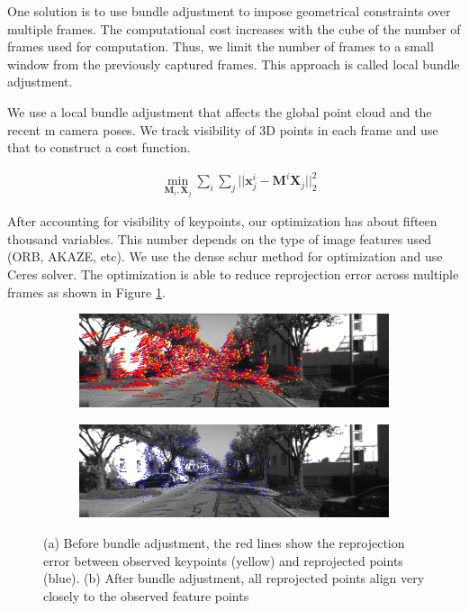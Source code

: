 \documentclass{article}
\begin{document}
One solution is to use bundle adjustment to impose geometrical constraints over multiple frames. The computational cost increases with the cube of the number of frames used for computation. Thus, we limit the number of frames to a small window from the previously captured frames. This approach is called local bundle adjustment.

We use a local bundle adjustment that affects the global point cloud and the recent m camera poses. We track visibility of 3D points in each frame and use that to construct a cost function.

\begin{align*}
    &\min_{\textbf{M}_i, \textbf{X}_j} \sum_i \sum_j || \textbf{x}^{i}_{j} - \textbf{M}^{i} \textbf{X}_j||^{2}_{2}
\end{align*}

After accounting for visibility of keypoints, our optimization has about fifteen thousand variables. This number depends on the type of image features used (ORB, AKAZE, etc). We use the dense schur method for optimization and use Ceres solver\cite{ceres-solver}. The optimization is able to reduce reprojection error across multiple frames as shown in Figure \ref{fig:reproj}.

\begin{figure}
    \centering
    \begin{subfigure}[b]{.45\textwidth}
        \includegraphics[width=\linewidth]{./before-ba.png}
        \caption{}
    \end{subfigure}
    \begin{subfigure}[b]{.45\textwidth}
        \includegraphics[width=\linewidth]{./after-ba.png}
        \caption{}
    \end{subfigure}
    \caption{(a) Before bundle adjustment, the red lines show the reprojection error between observed keypoints (yellow) and reprojected points (blue). (b) After bundle adjustment, all reprojected points align very closely to the observed feature points}
    \label{fig:reproj}
\end{figure}
\end{document}
